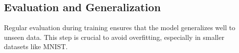 \documentclass{article}
\begin{document}
\subsection*{Evaluation and Generalization}
Regular evaluation during training ensures that the model generalizes well to unseen data. This step is crucial to avoid overfitting, especially in smaller datasets like MNIST.
\end{document}
